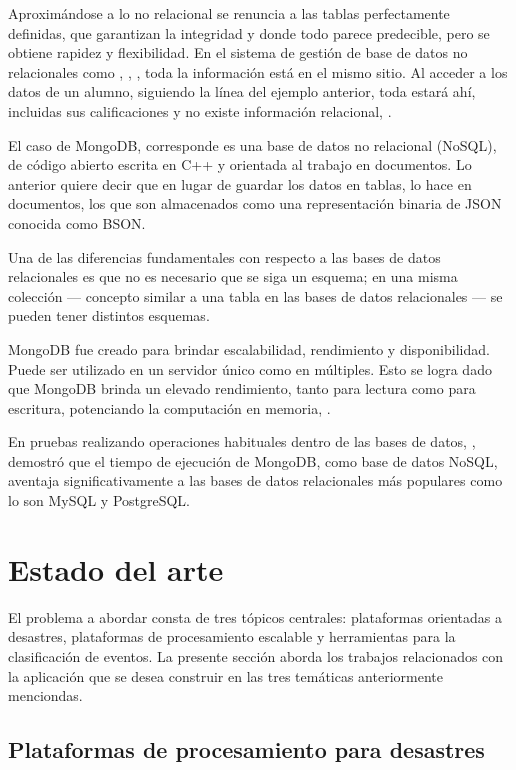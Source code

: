 Aproximándose a lo no relacional se renuncia a las tablas perfectamente definidas, que garantizan la integridad y donde todo parece predecible, pero se obtiene rapidez y flexibilidad. En el sistema de gestión de base de datos no relacionales como \cite{CassandraNOSQL}, \cite{redisNOSQL}, \cite{MongoDB}, toda la información está en el mismo sitio. Al acceder a los datos de un alumno, siguiendo la línea del ejemplo anterior, toda estará ahí, incluidas sus calificaciones y no existe información relacional, \cite{BDNOSQL}.

El caso de MongoDB, corresponde es una base de datos no relacional (NoSQL), de código abierto escrita en C++ y orientada al trabajo en documentos. Lo anterior quiere decir que en lugar de guardar los datos en tablas, lo hace en documentos, los que son almacenados como una representación binaria de JSON conocida como BSON.

Una de las diferencias fundamentales con respecto a las bases de datos relacionales es que no es necesario que se siga un esquema; en una misma colección — concepto similar a una tabla en las bases de datos relacionales — se pueden tener distintos esquemas.

MongoDB fue creado para brindar escalabilidad, rendimiento y disponibilidad. Puede ser utilizado en un servidor único como en múltiples. Esto se logra dado que MongoDB brinda un elevado rendimiento, tanto para lectura como para escritura, potenciando la computación en memoria, \cite{MongoDB}.

En pruebas realizando operaciones habituales dentro de las bases de datos, \cite{MongoPerformance}, demostró que el tiempo de ejecución de MongoDB, como base de datos NoSQL, aventaja significativamente a las bases de datos relacionales más populares como lo son MySQL y PostgreSQL.

\section{Estado del arte}
\label{intro:motivacion:arte}

El problema a abordar consta de tres tópicos centrales: plataformas orientadas a desastres, plataformas de procesamiento escalable y herramientas para la clasificación de eventos. La presente sección aborda los trabajos relacionados con la aplicación que se desea construir en las tres temáticas anteriormente menciondas.

\subsection{Plataformas de procesamiento para desastres}
\label{arte:PPDesastres}

